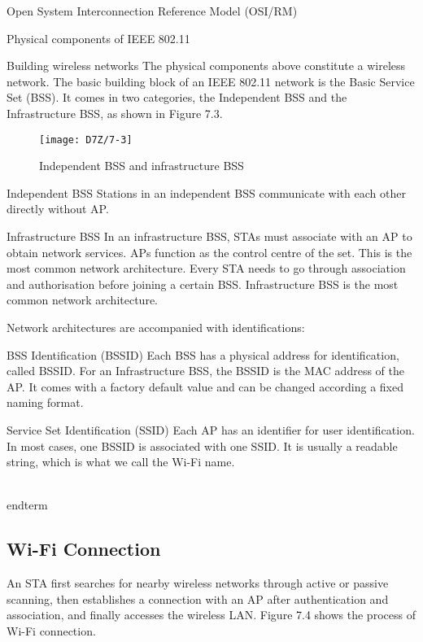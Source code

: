 \documentclass[a4paper,12pt]{book}
\begin{document}
\begin{term}{Open System Interconnection Reference Model (OSI/RM)}
\begin{term}{Physical components of IEEE 802.11}
\begin{term}{Building wireless networks}
    The physical components above constitute a wireless network. The basic building block of an IEEE 802.11 network is the Basic Service Set (BSS). It comes in two categories, the Independent BSS and the Infrastructure BSS, as shown in Figure 7.3.

    \begin{figure}[!h]
        \centering
        \texttt{[image: D7Z/7-3]}
        \caption{Independent BSS and infrastructure BSS}
    \end{figure}

    \parskip 6pt
    \begin{secterm}{Independent BSS}
        Stations in an independent BSS communicate with each other directly without AP.
    \end{secterm}

    \begin{secterm}{Infrastructure BSS}
        In an infrastructure BSS, STAs must associate with an AP to obtain network services. APs function as the control centre of the set. This is the most common network architecture. Every STA needs to go through association and authorisation before joining a certain BSS. Infrastructure BSS is the most common network architecture.
    \end{secterm}

    Network architectures are accompanied with identifications:

    \begin{secterm}{BSS Identification (BSSID)}
        Each BSS has a physical address for identification, called BSSID. For an Infrastructure BSS, the BSSID is the MAC address of the AP. It comes with a factory default value and can be changed according a fixed naming format.
    \end{secterm}

    \begin{secterm}{Service Set Identification (SSID)}
        Each AP has an identifier for user identification. In most cases, one BSSID is associated with one SSID. It is usually a readable string, which is what we call the Wi-Fi name.
    \end{secterm}
\\end{term}{}

\subsection{Wi-Fi Connection}
An STA first searches for nearby wireless networks through active or passive scanning, then establishes a connection with an AP after authentication and association, and finally accesses the wireless LAN. Figure 7.4 shows the process of Wi-Fi connection.


\end{term}
\end{term}
\end{term}
\end{document}
